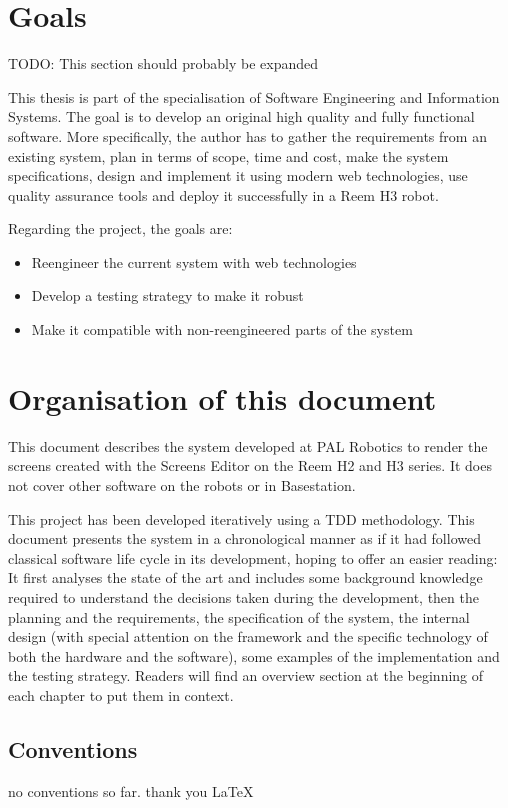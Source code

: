 \section{Goals}
TODO: This section should probably be expanded

This thesis is part of the specialisation of Software Engineering and Information Systems. 
The goal is to develop an original high quality and fully functional software. 
More specifically, the author has to gather the requirements from an existing system, plan in terms of scope, time and cost, make the system specifications, design and implement it using modern web technologies, use quality assurance tools and deploy it successfully in a Reem H3 robot.

Regarding the project, the goals are:
\begin{itemize}
\item Reengineer the current system with web technologies
\item Develop a testing strategy to make it robust
\item Make it compatible with non-reengineered parts of the system
\end{itemize}

\section{Organisation of this document}
This document describes the system developed at PAL Robotics to render the screens created with the Screens Editor on the Reem H2 and H3 series.
It does not cover other software on the robots or in Basestation.

This project has been developed iteratively using a \ac{TDD} methodology. 
This document presents the system in a chronological manner as if it had followed classical software life cycle in its development, hoping to offer an easier reading:
It first analyses the state of the art and includes some background knowledge required to understand the decisions taken during the development, then the planning and the requirements, the specification of the system, the internal design (with special attention on the framework and the specific technology of both the hardware and the software), some examples of the implementation and the testing strategy.
Readers will find an overview section at the beginning of each chapter to put them in context.

\subsection{Conventions}
no conventions so far. thank you \LaTeX
